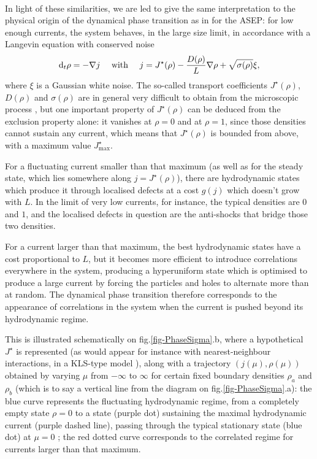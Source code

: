 \documentclass[aps,pre,onecolumn,showpacs,showkeys,a4paper]{revtex4-1}
\begin{document}
~

In light of these similarities, we are led to give the same interpretation to the physical origin of the dynamical phase transition as in \cite{Lazarescu2015} for the ASEP: for low enough currents, the system behaves, in the large size limit, in accordance with a Langevin equation with conserved noise
\begin{equation}\label{LangevinGas}
{\rm d}_t \rho=-\nabla j~~~~{\rm with}~~~~j=J^\star(\rho)-\frac{D(\rho)}{L}\nabla\rho+\sqrt{\sigma(\rho)}\xi,
\end{equation}
where $\xi$ is a Gaussian white noise. The so-called transport coefficients $J^\star(\rho)$, $D(\rho)$ and $\sigma(\rho)$ are in general very difficult to obtain from the microscopic process \cite{Arita2014,Arita2016}, but one important property of $J^\star(\rho)$ can be deduced from the exclusion property alone: it vanishes at $\rho=0$ and at $\rho=1$, since those densities cannot sustain any current, which means that $J^\star(\rho)$ is bounded from above, with a maximum value $J^\star_{\mathrm{max}}$.

For a fluctuating current smaller than that maximum (as well as for the steady state, which lies somewhere along $j=J^\star(\rho)$), there are hydrodynamic states which produce it through localised defects at a cost $g(j)$ which doesn't grow with $L$. In the limit of very low currents, for instance, the typical densities are $0$ and $1$, and the localised defects in question are the anti-shocks that bridge those two densities.

For a current larger than that maximum, the best hydrodynamic states have a cost proportional to $L$, but it becomes more efficient to introduce correlations everywhere in the system, producing a hyperuniform state which is optimised to produce a large current by forcing the particles and holes to alternate more than at random. The dynamical phase transition therefore corresponds to the appearance of correlations in the system when the current is pushed beyond its hydrodynamic regime.

This is illustrated schematically on fig.\ref{fig-PhaseSigma}.b, where a hypothetical $J^\star$ is represented (as would appear for instance with nearest-neighbour interactions, in a KLS-type model \cite{PhysRevB.28.1655,Popkov1999}), along with a trajectory $(j(\mu),\rho(\mu))$ obtained by varying $\mu$ from $-\infty$ to $\infty$ for certain fixed boundary densities $\rho_a$ and $\rho_b$ (which is to say a vertical line from the diagram on fig.\ref{fig-PhaseSigma}.a): the blue curve represents the fluctuating hydrodynamic regime, from a completely empty state $\rho=0$ to a state (purple dot) sustaining the maximal hydrodynamic current (purple dashed line), passing through the typical stationary state (blue dot) at $\mu=0$ ; the red dotted curve corresponds to the correlated regime for currents larger than that maximum.
\end{document}
